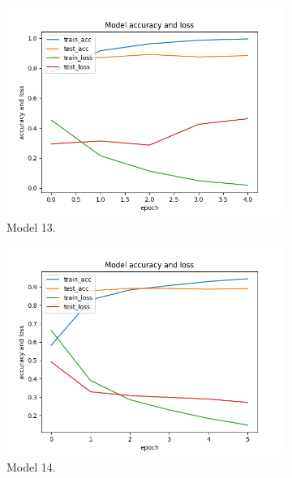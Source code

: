 \documentclass[11pt]{article}
\begin{document}
\begin{figure}[h!]
\begin{subfigure}{0.32\textwidth}
         \includegraphics[width=\textwidth]{model13.png}
         \caption{Model 13.}
         \label{fig:model13}
\end{subfigure}
\hfill
\begin{subfigure}{0.32\textwidth}
         \centering
         \includegraphics[width=\textwidth]{model14.png}
         \caption{Model 14.}
         \label{fig:model14}
\end{subfigure}
\begin{subfigure}{0.32\textwidth}
         \centering

\end{subfigure}
\end{figure}
\end{document}
